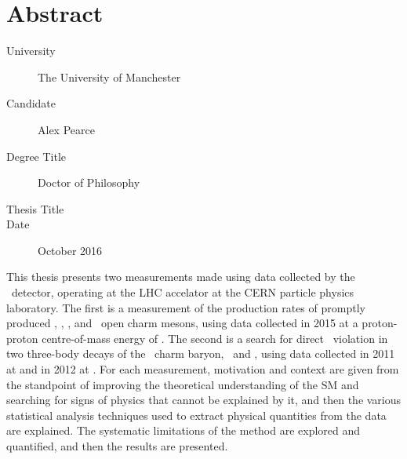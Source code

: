 \chapter{Abstract}

\begin{SingleSpace}

\begin{description}
  \item[University] The University of Manchester
  \item[Candidate] Alex Pearce
  \item[Degree Title] Doctor of Philosophy
  \item[Thesis Title] \thetitle
  \item[Date] October 2016
\end{description}

This thesis presents two measurements made using data collected by the \lhcb\ 
detector, operating at the \acl{LHC} accelator at the CERN particle physics 
laboratory.
The first is a measurement of the production rates of promptly produced 
\PDzero, \PDplus, \PDsplus, and \PDstarp\ open charm mesons, using data 
collected in 2015 at a proton-proton centre-of-mass energy of .
The second is a search for direct \CP\ violation in two three-body decays of 
the \PLambdac\ charm baryon, \pKK\ and \ppipi, using data collected in 2011 at 
\sqrtseq{7} and in 2012 at \sqrtseq{8}.
For each measurement, motivation and context are given from the standpoint of 
improving the theoretical understanding of the \acl{SM} and searching for signs 
of physics that cannot be explained by it, and then the various statistical 
analysis techniques used to extract physical quantities from the data are 
explained.
The systematic limitations of the method are explored and quantified, and then 
the results are presented.

\end{SingleSpace}
